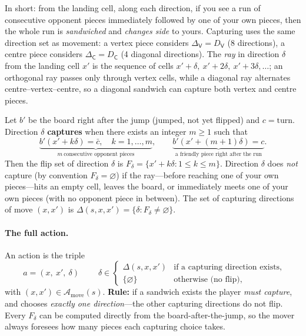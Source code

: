 In short: from the
landing cell, along each direction, if you see a run of consecutive opponent
pieces immediately followed by one of your own pieces, then the whole run is
\emph{sandwiched} and \emph{changes side} to yours. Capturing uses the same
direction set as movement: a vertex piece considers
$\Delta_{\mathsf V}=D_{\mathsf V}$ (8 directions), a centre piece considers
$\Delta_{\mathsf C}=D_{\mathsf C}$ (4 diagonal directions). The \emph{ray} in
direction $\delta$ from the landing cell $x'$ is the sequence of cells
$x'+\delta,\ x'+2\delta,\ x'+3\delta,\dots$; an orthogonal ray passes only
through vertex cells, while a diagonal ray alternates
centre--vertex--centre, so a diagonal sandwich can capture both vertex and
centre pieces.

Let $b'$ be the board right after the jump (jumped, not yet flipped) and
$c=\mathrm{turn}$. Direction $\delta$ \textbf{captures} when there exists an
integer $m\ge 1$ such that
\begin{equation}
\underbrace{b'(x'+k\delta)=\bar c,\quad k=1,\dots,m}_{m\ \text{consecutive opponent pieces}},
\qquad
\underbrace{b'(x'+(m{+}1)\delta)=c}_{\text{a friendly piece right after the run}}.
\label{eq:clamp}
\end{equation}
Then the flip set of direction $\delta$ is $F_\delta=\{x'+k\delta : 1\le
k\le m\}$. Direction $\delta$ does \emph{not} capture (by convention
$F_\delta=\varnothing$) if the ray---before reaching one of your own
pieces---hits an empty cell, leaves the board, or immediately meets one of
your own pieces (with no opponent piece in between). The set of capturing
directions of move $(x,x')$ is $\Delta(s,x,x')=\{\delta :
F_\delta\neq\varnothing\}$.

\paragraph{The full action.} An action is the triple
\begin{equation}
\boxed{\;a=(x,\ x',\ \delta)\;}
\qquad
\delta\in
\begin{cases}
\Delta(s,x,x') & \text{if a capturing direction exists},\\
\{\varnothing\} & \text{otherwise (no flip)},
\end{cases}
\label{eq:action}
\end{equation}
with $(x,x')\in\mathcal A_{\mathrm{move}}(s)$. \textbf{Rule:} if a sandwich
exists the player \emph{must capture}, and chooses \emph{exactly one
direction}---the other capturing directions do not flip. Every $F_\delta$
can be computed directly from the board-after-the-jump, so the mover always
foresees how many pieces each capturing choice takes.
